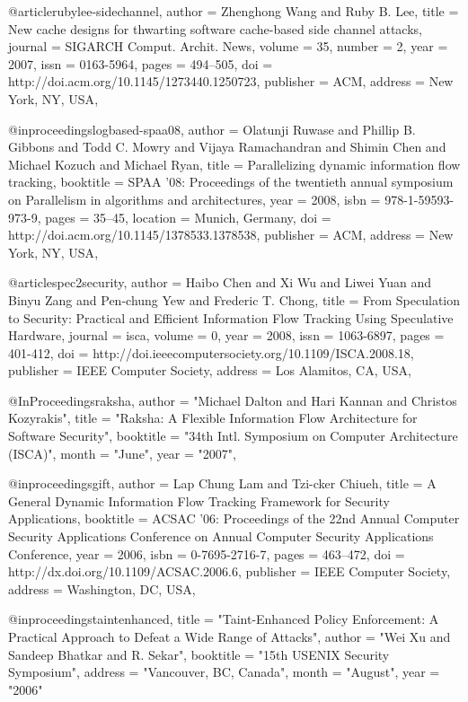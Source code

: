 @article{rubylee-sidechannel,
 author = {Zhenghong Wang and Ruby B. Lee},
 title = {New cache designs for thwarting software cache-based side channel attacks},
 journal = {SIGARCH Comput. Archit. News},
 volume = {35},
 number = {2},
 year = {2007},
 issn = {0163-5964},
 pages = {494--505},
 doi = {http://doi.acm.org/10.1145/1273440.1250723},
 publisher = {ACM},
 address = {New York, NY, USA},
 }



@inproceedings{logbased-spaa08,
 author = {Olatunji Ruwase and Phillip B. Gibbons and Todd C. Mowry and Vijaya Ramachandran and Shimin Chen and Michael Kozuch and Michael Ryan},
 title = {Parallelizing dynamic information flow tracking},
 booktitle = {SPAA '08: Proceedings of the twentieth annual symposium on Parallelism in algorithms and architectures},
 year = {2008},
 isbn = {978-1-59593-973-9},
 pages = {35--45},
 location = {Munich, Germany},
 doi = {http://doi.acm.org/10.1145/1378533.1378538},
 publisher = {ACM},
 address = {New York, NY, USA},
 }


@article{spec2security,
author = {Haibo Chen and Xi Wu and Liwei Yuan and Binyu Zang and Pen-chung Yew and Frederic T. Chong},
title = {From Speculation to Security: Practical and Efficient Information Flow Tracking Using Speculative Hardware},
journal = {isca},
volume = {0},
year = {2008},
issn = {1063-6897},
pages = {401-412},
doi = {http://doi.ieeecomputersociety.org/10.1109/ISCA.2008.18},
publisher = {IEEE Computer Society},
address = {Los Alamitos, CA, USA},
}

@InProceedings{raksha,
  author =       "Michael Dalton and Hari Kannan and Christos Kozyrakis",
  title =        "{Raksha: A Flexible Information Flow Architecture for Software Security}",
  booktitle =    "{34th Intl. Symposium on Computer Architecture (ISCA)}",
  month =        "June",
  year =         "2007",
}

@inproceedings{gift,
 author = {Lap Chung Lam and Tzi-cker Chiueh},
 title = {A General Dynamic Information Flow Tracking Framework for Security Applications},
 booktitle = {ACSAC '06: Proceedings of the 22nd Annual Computer Security Applications Conference on Annual Computer Security Applications Conference},
 year = {2006},
 isbn = {0-7695-2716-7},
 pages = {463--472},
 doi = {http://dx.doi.org/10.1109/ACSAC.2006.6},
 publisher = {IEEE Computer Society},
 address = {Washington, DC, USA},
 }

@inproceedings{taintenhanced,
  title     = "Taint-Enhanced Policy Enforcement: A Practical Approach to Defeat a Wide Range of Attacks",
  author = "Wei Xu and Sandeep Bhatkar and R. Sekar",
  booktitle = "15th {USENIX} Security Symposium",
  address   = "Vancouver, BC, Canada",
  month     = "August",
  year      = "2006"
}

